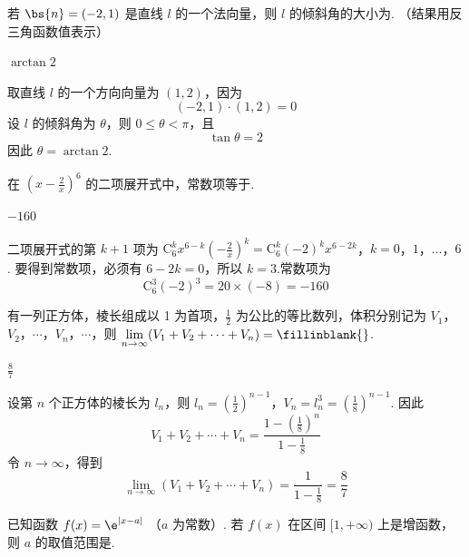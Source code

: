 \begin{problem}
若 \(\bs{n} = (-2,1)\) 是直线 \(l\) 的一个法向量，则 \(l\) 的倾斜角的大小为\fillinblank{}. （结果用反三角函数值表示）
\end{problem}

\begin{answer}
\(\arctan 2\)
\end{answer}

\begin{solution}
取直线 \(l\) 的一个方向向量为 \((1,2)\)，因为
\[
(-2,1)\cdot(1,2)=0
\]
设 \(l\) 的倾斜角为 \(\theta\)，则 \(0\leqslant\theta<\pi\)，且
\[
\tan\theta=2
\]
因此 \(\theta=\arctan 2\).
\end{solution}

\begin{problem}
在 \(\left(x - \frac{2}{x}\right)^6\) 的二项展开式中，常数项等于\fillinblank{}.
\end{problem}

\begin{answer}
\(-160\)
\end{answer}

\begin{solution}
二项展开式的第 \(k+1\) 项为
\(\mathrm C_6^k x^{6-k}\left(-\frac{2}{x}\right)^k =\mathrm C_6^k(-2)^k x^{6-2k}\)，\(k=0\)，\(1\)，\(\ldots\)，\(6\).
要得到常数项，必须有 \(6-2k=0\)，所以 \(k=3\).常数项为
\[
\mathrm C_6^3(-2)^3=20\times(-8)=-160
\]
\end{solution}

\begin{problem}
有一列正方体，棱长组成以 1 为首项，\(\frac{1}{2}\) 为公比的等比数列，体积分别记为 \(V_{1}\)，\(V_{2}\)，\(\cdots\)，\(V_{n}\)，\(\cdots\)，则 \(\displaystyle\lim_{n \to \infty} (V_{1} + V_{2} + \cdots + V_{n}) =\fillinblank{}\).
\end{problem}

\begin{answer}
\(\frac{8}{7}\)
\end{answer}

\begin{solution}
设第 \(n\) 个正方体的棱长为 \(l_n\)，则
\(l_n=\left(\frac{1}{2}\right)^{n-1}\)，\(V_n=l_n^3=\left(\frac{1}{8}\right)^{n-1}\).
因此
\[
V_1+V_2+\cdots+V_n
=\frac{1-\left(\frac{1}{8}\right)^n}{1-\frac{1}{8}}
\]
令 \(n\to\infty\)，得到
\[
\lim_{n\to\infty}(V_1+V_2+\cdots+V_n)=\frac{1}{1-\frac18}=\frac87
\]
\end{solution}

\begin{problem}
已知函数 \( f(x) = \e^{|x - a|} \) （\( a \) 为常数）. 若 \( f(x) \) 在区间 \([1, +\infty)\) 上是增函数，则 \( a \) 的取值范围是\fillinblank{}.
\end{problem}

